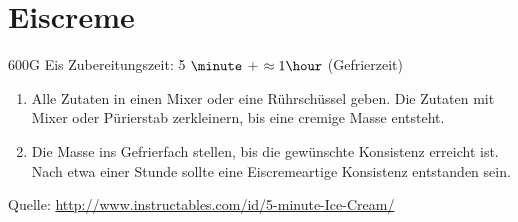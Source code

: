 \chapter{Eiscreme}
600G Eis \hfill Zubereitungszeit: 5 $\minute$ + $\approx1 \hour$ (Gefrierzeit)
\begin{enumerate}
\item	Alle Zutaten in einen Mixer oder eine Rührschüssel geben.
	Die Zutaten mit Mixer oder Pürierstab zerkleinern, bis eine cremige Masse entsteht.
\item   Die Masse ins Gefrierfach stellen, bis die gewünschte Konsistenz erreicht ist.
	Nach etwa einer Stunde sollte eine Eiscremeartige Konsistenz entstanden sein.
\end{enumerate}

Quelle: \url{http://www.instructables.com/id/5-minute-Ice-Cream/}
